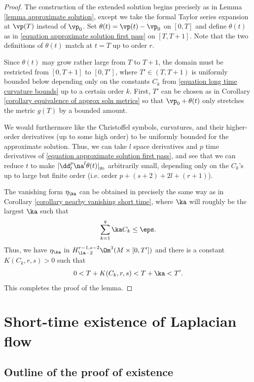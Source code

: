 \documentclass[hidelinks, 12pt, oneside, reqno]{amsart}
\begin{document}
\begin{proof}
    The construction of the extended solution begins precisely as in Lemma \ref{lemma approximate solution}, except we take the formal Taylor series expansion at $\vp(T)$ instead of $\vp_0$. Set $\theta(t) = \vp(t) - \vp_0$ on $[0,T]$ and define $\theta(t)$ as in \eqref{equation approximate solution first pass} on $[T,T + 1]$. Note that the two definitions of $\theta(t)$ match at $t=T$ up to order $r$. 
    
    Since $\theta(t)$ may grow rather large from $T$ to $T+1$, the domain must be restricted from $[0,T+1]$ to $[0, T']$, where $T' \in (T, T+1)$ is uniformly bounded below depending only on the constants $C_k$ from \eqref{equation long time curvature bounds} up to a certain order $k$. First, $T'$ can be chosen as in Corollary \ref{corollary equivalence of approx soln metrics} so that $\vp_0 + \theta(t)$ only stretches the metric $g(T)$ by a bounded amount.  
    
    We would furthermore like the Christoffel symbols, curvatures, and their higher-order derivatives (up to some high order) to be uniformly bounded for the approximate solution. Thus, we can take $l$ space derivatives and $p$ time derivatives of \eqref{equation approximate solution first pass}, and see that we can reduce $t$ to make $|\dd_t^p \na^l \theta(t)|_{g_0}$ arbitrarily small, depending only on the $C_k$'s up to large but finite order (i.e. order $p + (s + 2) + 2l + (r +1)$). 

    The vanishing form $\eta_\ka$ can be obtained in precisely the same way as in Corollary \ref{corollary nearby vanishing short time}, where $\ka$ will roughly be the largest $\ka$ such that 
    \[
    \sum_{k = 1}^q \ka C_k \le \eps. 
    \]
    Thus, we have $\eta_\ka$ in $H^{r-1,s-2}_{\la-2}\Om^3(M \times [0,T'])$ and there is a constant $K(C_k,r,s) > 0$ such that 
    \[
    0 < T + K(C_k,r,s) < T + \ka < T'. 
    \]
    This completes the proof of the lemma.
\end{proof}

\section{Short-time existence of Laplacian flow}\label{section short time existence IVT argument}

\subsection{Outline of the proof of existence}\label{subsection existence outline}
\end{document}

